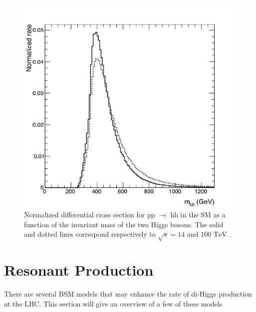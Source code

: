 \begin{figure}[h]
\begin{center}
\includegraphics[scale=0.5]{figures/SM_continuum}
\caption[Normalized di-Higgs cross section]{Normalized differential cross section for pp ${\rightarrow}$ hh in the SM as a function of the invariant mass of the two Higgs bosons. The solid and dotted lines correspond respectively to ${\sqrt{s} = 14 \text{ and } 100 \text{ TeV}}$ .\cite{azatov:2015}}
\label{fig:SM_cont}
\end{center}
\end{figure}


\section{Resonant Production}
There are several BSM models that may enhance the rate of di-Higgs production at the LHC. This section will give an overview of a few of these models
